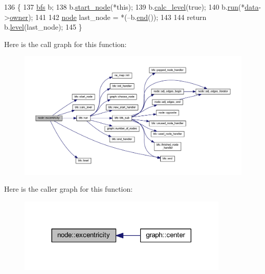 \begin{DoxyCode}
136 \{
137     \mbox{\hyperlink{classbfs}{bfs}} b;
138     b.\mbox{\hyperlink{classbfs_a23e2981c2ee617a6e12a8833d2db6210}{start\_node}}(*\textcolor{keyword}{this});
139     b.\mbox{\hyperlink{classbfs_a491515da4eb8efca0be4fef0df350a8e}{calc\_level}}(\textcolor{keyword}{true});
140     b.\mbox{\hyperlink{classbfs_a06ae16bd0f3bb2f8eb6b3e36659ba82e}{run}}(*\mbox{\hyperlink{classnode_a4ae3d54ebb61be3a102bedf5b91bef75}{data}}->\mbox{\hyperlink{classnode__data_a20acb07c56fa28df6cbdbf3b0a02cb66}{owner}});
141 
142     \mbox{\hyperlink{classnode}{node}} last\_node = *(--b.\mbox{\hyperlink{classbfs_ac35b3d3c37d33eb80adb752e17a60df9}{end}}());
143     
144     \textcolor{keywordflow}{return} b.\mbox{\hyperlink{classbfs_ac0158a0453fb17a89be4049d21db56b1}{level}}(last\_node);
145 \}
\end{DoxyCode}
Here is the call graph for this function\+:\nopagebreak
\begin{figure}[H]
\begin{center}
\leavevmode
\includegraphics[width=350pt]{classnode_aba6b3a48e7b951f08ebbbf3275f0ce9a_cgraph}
\end{center}
\end{figure}
Here is the caller graph for this function\+:\nopagebreak
\begin{figure}[H]
\begin{center}
\leavevmode
\includegraphics[width=284pt]{classnode_aba6b3a48e7b951f08ebbbf3275f0ce9a_icgraph}
\end{center}
\end{figure}
\mbox{\label{classnode_a5d38b4152c3cedb235e45de7eb3f4469}} 
